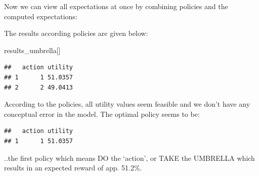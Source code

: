 \documentclass[
]{article}
\newenvironment{Shaded}{\begin{snugshade}}{\end{snugshade}}
\newcommand{\ControlFlowTok}[1]{\textcolor[rgb]{0.13,0.29,0.53}{\textbf{#1}}}
\newcommand{\DecValTok}[1]{\textcolor[rgb]{0.00,0.00,0.81}{#1}}
\newcommand{\FunctionTok}[1]{\textcolor[rgb]{0.00,0.00,0.00}{#1}}
\newcommand{\NormalTok}[1]{#1}
\newcommand{\OtherTok}[1]{\textcolor[rgb]{0.56,0.35,0.01}{#1}}
\newcommand{\SpecialCharTok}[1]{\textcolor[rgb]{0.00,0.00,0.00}{#1}}
\newcommand{\StringTok}[1]{\textcolor[rgb]{0.31,0.60,0.02}{#1}}
\begin{document}
Now we can view all expectations at once by combining policies and the computed expectations:

\begin{Shaded}
\end{Shaded}

The results according policies are given below:

\begin{Shaded}
\begin{Highlighting}[]
\NormalTok{results\_umbrella[]}
\end{Highlighting}
\end{Shaded}

\begin{verbatim}
##   action utility
## 1      1 51.0357
## 2      2 49.0413
\end{verbatim}

According to the policies, all utility values seem feasible and we don't have any conceptual error in the model.
The optimal policy seems to be:

\begin{Shaded}
\end{Shaded}

\begin{verbatim}
##   action utility
## 1      1 51.0357
\end{verbatim}

..the first policy which means DO the `action', or TAKE the UMBRELLA which results in an expected reward of app. 51.2\%.
\end{document}
